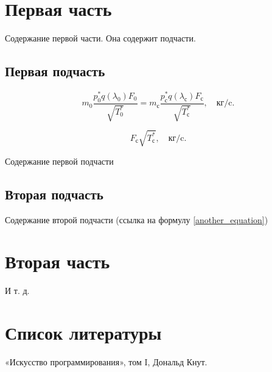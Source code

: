 \documentclass[a4paper, 12pt]{article} %
\begin{document}
\thispagestyle{empty}
\tableofcontents
\renewcommand{\contentsname}{Оглавление}

\newpage

\section{Первая часть}
Содержание первой части. Она содержит подчасти. \cite{knut}

\subsection{Первая подчасть}

\begin{equation}\label{gas_dyn}
m_0 \dfrac{p_0^*q(\lambda_0)F_0}{\sqrt{T_0^*}} = 
m_\text{с}\dfrac{p_\text{с}^*q(\lambda_\text{с})
F_\text{с}}{\sqrt{T_\text{с}^*}}, \quad\text{кг/c}.
\end{equation}

\begin{equation}\label{another_equation}
F_\text{с}{\sqrt{T_\text{с}^*}}, \quad\text{кг/c}.
\end{equation}

Содержание первой подчасти

\subsection{Вторая подчасть}

Содержание второй подчасти (ссылка на формулу \ref{another_equation})

\section{Вторая часть}

И т. д.

\newpage

\section*{Список литературы}
\begin{enumerate}
   «Искусство программирования», том I, Дональд Кнут.
\end{enumerate}
\end{document}
